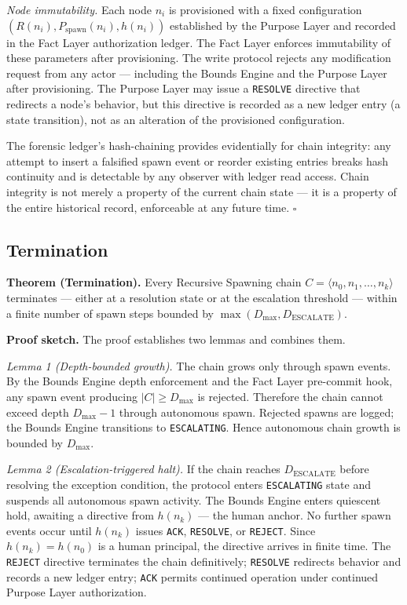 \medskip
\textit{Node immutability.} Each node $n_i$ is provisioned with a fixed configuration $(R(n_i), P_{\mathrm{spawn}}(n_i), h(n_i))$ established by the Purpose Layer and recorded in the Fact Layer authorization ledger. The Fact Layer enforces immutability of these parameters after provisioning. The write protocol rejects any modification request from any actor --- including the Bounds Engine and the Purpose Layer after provisioning. The Purpose Layer may issue a \texttt{RESOLVE} directive that redirects a node's behavior, but this directive is recorded as a new ledger entry (a state transition), not as an alteration of the provisioned configuration.

The forensic ledger's hash-chaining provides evidentially for chain integrity: any attempt to insert a falsified spawn event or reorder existing entries breaks hash continuity and is detectable by any observer with ledger read access. Chain integrity is not merely a property of the current chain state --- it is a property of the entire historical record, enforceable at any future time. $\square$

\subsection{Termination}
\label{sec:rs-termination}

\medskip
\noindent\textbf{Theorem (Termination).} Every Recursive Spawning chain $C = \langle n_0, n_1, \ldots, n_k \rangle$ terminates --- either at a resolution state or at the escalation threshold --- within a finite number of spawn steps bounded by $\max(D_{\mathrm{max}}, D_{\mathrm{ESCALATE}})$.

\medskip
\noindent\textbf{Proof sketch.} The proof establishes two lemmas and combines them.

\medskip
\textit{Lemma 1 (Depth-bounded growth).} The chain grows only through spawn events. By the Bounds Engine depth enforcement and the Fact Layer pre-commit hook, any spawn event producing $|C| \geq D_{\mathrm{max}}$ is rejected. Therefore the chain cannot exceed depth $D_{\mathrm{max}} - 1$ through autonomous spawn. Rejected spawns are logged; the Bounds Engine transitions to \texttt{ESCALATING}. Hence autonomous chain growth is bounded by $D_{\mathrm{max}}$.

\medskip
\textit{Lemma 2 (Escalation-triggered halt).} If the chain reaches $D_{\mathrm{ESCALATE}}$ before resolving the exception condition, the protocol enters \texttt{ESCALATING} state and suspends all autonomous spawn activity. The Bounds Engine enters quiescent hold, awaiting a directive from $h(n_k)$ --- the human anchor. No further spawn events occur until $h(n_k)$ issues \texttt{ACK}, \texttt{RESOLVE}, or \texttt{REJECT}. Since $h(n_k) = h(n_0)$ is a human principal, the directive arrives in finite time. The \texttt{REJECT} directive terminates the chain definitively; \texttt{RESOLVE} redirects behavior and records a new ledger entry; \texttt{ACK} permits continued operation under continued Purpose Layer authorization.

